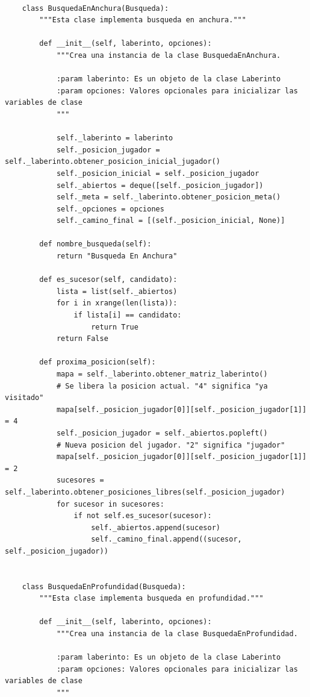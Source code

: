 \documentclass[letter, titlepage, 10pt]{article}
\begin{document}
\begin{lstlisting}
    
    class BusquedaEnAnchura(Busqueda):
        """Esta clase implementa busqueda en anchura."""
    
        def __init__(self, laberinto, opciones):
            """Crea una instancia de la clase BusquedaEnAnchura.
            
            :param laberinto: Es un objeto de la clase Laberinto
            :param opciones: Valores opcionales para inicializar las variables de clase
            """
    
            self._laberinto = laberinto
            self._posicion_jugador = self._laberinto.obtener_posicion_inicial_jugador()
            self._posicion_inicial = self._posicion_jugador
            self._abiertos = deque([self._posicion_jugador])
            self._meta = self._laberinto.obtener_posicion_meta()
            self._opciones = opciones
            self._camino_final = [(self._posicion_inicial, None)]
        
        def nombre_busqueda(self):
            return "Busqueda En Anchura"
        
        def es_sucesor(self, candidato):
            lista = list(self._abiertos)
            for i in xrange(len(lista)):
                if lista[i] == candidato:
                    return True
            return False
    
        def proxima_posicion(self):
            mapa = self._laberinto.obtener_matriz_laberinto()
            # Se libera la posicion actual. "4" significa "ya visitado"
            mapa[self._posicion_jugador[0]][self._posicion_jugador[1]] = 4
            self._posicion_jugador = self._abiertos.popleft()
            # Nueva posicion del jugador. "2" significa "jugador"
            mapa[self._posicion_jugador[0]][self._posicion_jugador[1]] = 2
            sucesores = self._laberinto.obtener_posiciones_libres(self._posicion_jugador)
            for sucesor in sucesores:
                if not self.es_sucesor(sucesor):
                    self._abiertos.append(sucesor)
                    self._camino_final.append((sucesor, self._posicion_jugador))
    
    
    class BusquedaEnProfundidad(Busqueda):
        """Esta clase implementa busqueda en profundidad."""
    
        def __init__(self, laberinto, opciones):
            """Crea una instancia de la clase BusquedaEnProfundidad.
            
            :param laberinto: Es un objeto de la clase Laberinto
            :param opciones: Valores opcionales para inicializar las variables de clase
            """
    

\end{lstlisting}
\end{document}
